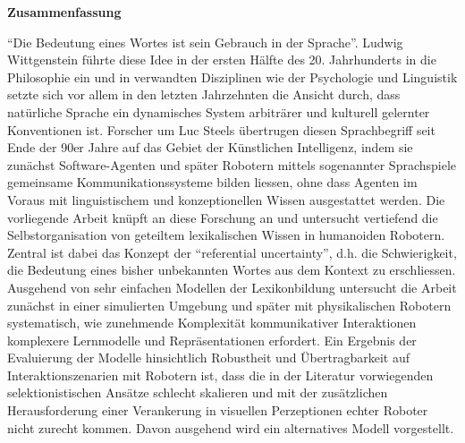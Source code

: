 \begin{addmargin}[1.2cm]{1.2cm}

{\Large\sffamily\bfseries Zusammenfassung}
\vspace{0.5cm}

\noindent ``Die Bedeutung eines Wortes ist sein Gebrauch in der
Sprache''. Ludwig Wittgenstein führte diese Idee in der ersten Hälfte
des 20. Jahrhunderts in die Philosophie ein und in verwandten
Disziplinen wie der Psychologie und Linguistik setzte sich vor allem
in den letzten Jahrzehnten die Ansicht durch, dass natürliche Sprache
ein dynamisches System arbiträrer und kulturell gelernter Konventionen
ist. Forscher um Luc Steels übertrugen diesen Sprachbegriff seit Ende
der 90er Jahre auf das Gebiet der Künstlichen Intelligenz, indem sie
zunächst Software-Agenten und später Robotern mittels sogenannter
Sprachspiele gemeinsame Kommunikationssysteme bilden liessen, ohne
dass Agenten im Voraus mit linguistischem und konzeptionellen Wissen
ausgestattet werden. Die vorliegende Arbeit knüpft an diese Forschung
an und untersucht vertiefend die Selbstorganisation von geteiltem
lexikalischen Wissen in humanoiden Robotern. Zentral ist dabei das
Konzept der ``referential uncertainty'', d.h. die Schwierigkeit, die
Bedeutung eines bisher unbekannten Wortes aus dem Kontext zu
erschliessen. Ausgehend von sehr einfachen Modellen der Lexikonbildung
untersucht die Arbeit zunächst in einer simulierten Umgebung und
später mit physikalischen Robotern systematisch, wie zunehmende
Komplexität kommunikativer Interaktionen komplexere Lernmodelle und
Reprä\-sentationen erfordert. Ein Ergebnis der Evaluierung der Modelle
hinsichtlich Robustheit und Übertragbarkeit auf Interaktionszenarien
mit Robotern ist, dass die in der Literatur vorwiegenden
selektionistischen Ansätze schlecht skalieren und mit der zusätzlichen
Herausforderung einer Verankerung in visuellen Perzeptionen echter
Roboter nicht zurecht kommen. Davon ausgehend wird ein alternatives
Modell vorgestellt.
\end{addmargin}

\cleardoublepage

\normalsize

